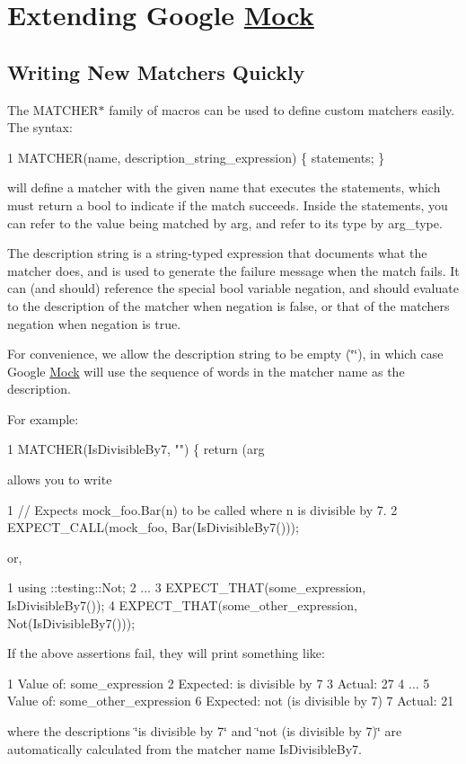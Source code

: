 \section*{Extending Google \hyperlink{class_mock}{Mock}}

\subsection*{Writing New Matchers Quickly}

The {\ttfamily M\+A\+T\+C\+H\+E\+R$\ast$} family of macros can be used to define custom matchers easily. The syntax\+:


\begin{DoxyCode}
1 MATCHER(name, description\_string\_expression) \{ statements; \}
\end{DoxyCode}


will define a matcher with the given name that executes the statements, which must return a {\ttfamily bool} to indicate if the match succeeds. Inside the statements, you can refer to the value being matched by {\ttfamily arg}, and refer to its type by {\ttfamily arg\+\_\+type}.

The description string is a {\ttfamily string}-\/typed expression that documents what the matcher does, and is used to generate the failure message when the match fails. It can (and should) reference the special {\ttfamily bool} variable {\ttfamily negation}, and should evaluate to the description of the matcher when {\ttfamily negation} is {\ttfamily false}, or that of the matcher\textquotesingle{}s negation when {\ttfamily negation} is {\ttfamily true}.

For convenience, we allow the description string to be empty ({\ttfamily \char`\"{}\char`\"{}}), in which case Google \hyperlink{class_mock}{Mock} will use the sequence of words in the matcher name as the description.

For example\+: 
\begin{DoxyCode}
1 MATCHER(IsDivisibleBy7, "") \{ return (arg %
\end{DoxyCode}
 allows you to write 
\begin{DoxyCode}
1 // Expects mock\_foo.Bar(n) to be called where n is divisible by 7.
2 EXPECT\_CALL(mock\_foo, Bar(IsDivisibleBy7()));
\end{DoxyCode}
 or, 
\begin{DoxyCode}
1 using ::testing::Not;
2 ...
3   EXPECT\_THAT(some\_expression, IsDivisibleBy7());
4   EXPECT\_THAT(some\_other\_expression, Not(IsDivisibleBy7()));
\end{DoxyCode}
 If the above assertions fail, they will print something like\+: 
\begin{DoxyCode}
1   Value of: some\_expression
2   Expected: is divisible by 7
3     Actual: 27
4 ...
5   Value of: some\_other\_expression
6   Expected: not (is divisible by 7)
7     Actual: 21
\end{DoxyCode}
 where the descriptions {\ttfamily \char`\"{}is divisible by 7\char`\"{}} and {\ttfamily \char`\"{}not (is divisible
by 7)\char`\"{}} are automatically calculated from the matcher name {\ttfamily Is\+Divisible\+By7}.

